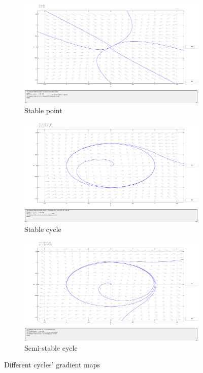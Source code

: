 \begin{figure}[!htb]
	\centering
	\begin{subfigure}[b]{0.45\linewidth}
		\centering
		\includegraphics[trim=116 155 125 55,clip,width=\linewidth]{imgs/stable-point}
		\caption{Stable point}%
		\label{fig:stable-point}
	\end{subfigure}
	\begin{subfigure}[b]{0.45\linewidth}
		\centering
		\includegraphics[trim=116 155 125 55,clip,width=\linewidth]{imgs/stable-cycle}
		\caption{Stable cycle}%
		\label{fig:stable-cycle}
	\end{subfigure}
	\begin{subfigure}[b]{0.5\linewidth}
		\centering
		\includegraphics[trim=116 155 125 55,clip,width=\linewidth]{imgs/semi-stable-cycle}
		\caption{Semi-stable cycle}%
		\label{fig:semi-stable-cycle}
	\end{subfigure}
	\caption{Different cycles' gradient maps}%
	\label{fig:poincare-cycles}
\end{figure}

